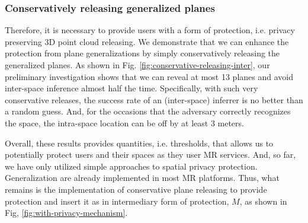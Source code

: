 \subsubsection*{Conservatively releasing generalized planes} 
Therefore, it is necessary to provide users with a form of protection, i.e. privacy preserving 3D point cloud releasing. We demonstrate that we can enhance the protection from plane generalizations by simply conservatively releasing the generalized planes. As shown in Fig. \ref{fig:conservative-releasing-inter}, our preliminary investigation shows that we can reveal at most 13 planes and avoid inter-space inference almost half the time. Specifically, with such very conservative releases, the success rate of an (inter-space) inferrer is no better than a random guess. And, for the occasions that the adversary correctly recognizes the space, the intra-space location can be off by at least 3 meters. %

Overall, these results provides quantities, i.e. thresholds, that allows us to potentially protect users and their spaces as they user MR services. And, so far, we have only utilized simple approaches to spatial privacy protection. Generalization are already implemented in most MR platforms. Thus, what remains is the implementation of conservative plane releasing to provide protection and insert it as in intermediary form of protection, $M$, as shown in Fig, \ref{fig:with-privacy-mechanism}.
